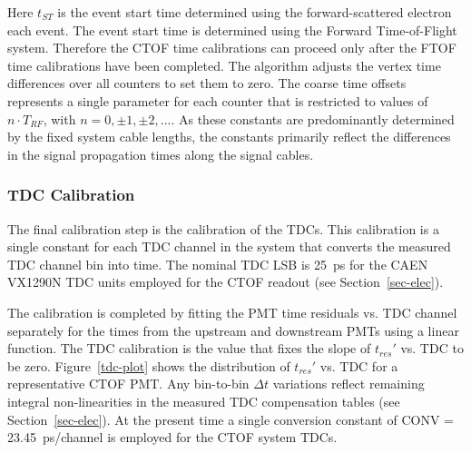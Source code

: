 \documentclass{elsart}
\begin{document}
\noindent
Here $t_{ST}$ is the event start time determined using the forward-scattered electron each event. The
event start time is determined using the Forward Time-of-Flight system. Therefore the CTOF time
calibrations can proceed only after the FTOF time calibrations have been completed. The algorithm
adjusts the vertex time differences over all counters to set them to zero. The coarse time offsets
represents a single parameter for each counter that is restricted to values of $n \cdot T_{RF}$, with
$n = 0, \pm 1, \pm 2, ...$. As these constants are predominantly determined by the fixed system cable
lengths, the constants primarily reflect the differences in the signal propagation times along the signal
cables.

\subsubsection{TDC Calibration}
\label{sec-tdccal}

The final calibration step is the calibration of the TDCs. This calibration is a single constant for each
TDC channel in the system that converts the measured TDC channel bin into time. The nominal TDC
LSB is 25~ps for the CAEN VX1290N TDC units employed for the CTOF readout (see
Section~\ref{sec-elec}).

The calibration is completed by fitting the PMT time residuals vs. TDC channel separately for the times
from the upstream and downstream PMTs using a linear function. The TDC calibration is the value that
fixes the slope of $t_{res}'$ vs. TDC to be zero. Figure~\ref{tdc-plot} shows the distribution of $t_{res}'$
vs. TDC for a representative CTOF PMT. Any bin-to-bin $\Delta t$ variations reflect remaining integral
non-linearities in the measured TDC compensation tables (see Section~\ref{sec-elec}). At the present
time a single conversion constant of CONV = 23.45~ps/channel is employed for the CTOF system TDCs.
\end{document}
